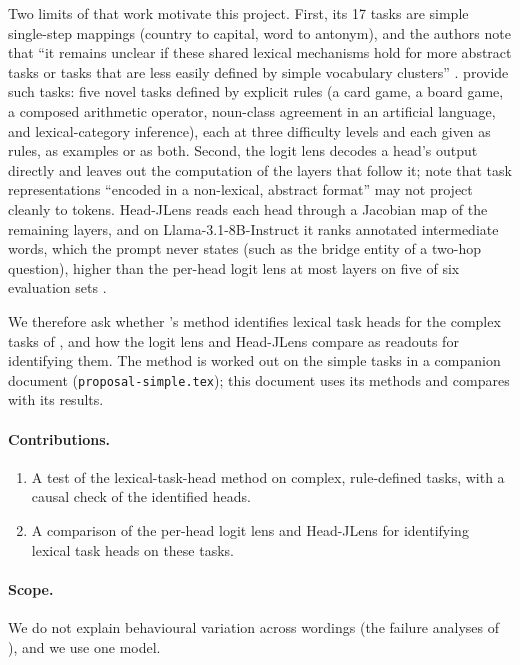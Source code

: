 \documentclass[11pt,a4paper]{article}
\begin{document}
Two limits of that work motivate this project. First, its 17 tasks are simple single-step mappings (country to capital, word to antonym), and the authors note that ``it remains unclear if these shared lexical mechanisms hold for more abstract tasks or tasks that are less easily defined by simple vocabulary clusters'' \citep[Sec.~4]{yang2026shared}. \citet{fu2026rules} provide such tasks: five novel tasks defined by explicit rules (a card game, a board game, a composed arithmetic operator, noun-class agreement in an artificial language, and lexical-category inference), each at three difficulty levels and each given as rules, as examples or as both. Second, the logit lens decodes a head's output directly and leaves out the computation of the layers that follow it; \citet[Sec.~4]{yang2026shared} note that task representations ``encoded in a non-lexical, abstract format'' may not project cleanly to tokens. Head-JLens reads each head through a Jacobian map of the remaining layers, and on Llama-3.1-8B-Instruct it ranks annotated intermediate words, which the prompt never states (such as the bridge entity of a two-hop question), higher than the per-head logit lens at most layers on five of six evaluation sets \citep[Sec.~3]{merlo2026headjlens}.

We therefore ask whether \citeauthor{yang2026shared}'s method identifies lexical task heads for the complex tasks of \citet{fu2026rules}, and how the logit lens and Head-JLens compare as readouts for identifying them. The method is worked out on the simple tasks in a companion document (\texttt{proposal-simple.tex}); this document uses its methods and compares with its results.

\paragraph{Contributions.}
\begin{enumerate}
\item A test of the lexical-task-head method on complex, rule-defined tasks, with a causal check of the identified heads.
\item A comparison of the per-head logit lens and Head-JLens for identifying lexical task heads on these tasks.
\end{enumerate}

\paragraph{Scope.} We do not explain behavioural variation across wordings (the failure analyses of \citealp[Sec.~2.4]{yang2026shared}), and we use one model.
\end{document}
